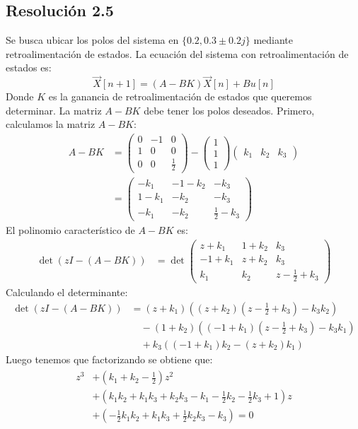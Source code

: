 \documentclass[
  11pt,
  letterpaper,
   addpoints,
   answers
  ]{exam}
\begin{document}
\begin{questions}
\begin{solution}
\subsection*{Resolución 2.5}
Se busca ubicar los polos del sistema en $\{0.2, 0.3 \pm 0.2j\}$ mediante retroalimentación de estados. La ecuación del sistema con retroalimentación de estados es:
\begin{equation}
  \vec{X}[n+1] = (A - BK)\vec{X}[n] + Bu[n]
\end{equation}
Donde $K$ es la ganancia de retroalimentación de estados que queremos determinar. La matriz $A - BK$ debe tener los polos deseados. Primero, calculamos la matriz $A - BK$:
\begin{align}
  A - BK &= \begin{pmatrix} 0 & -1 & 0 \\ 1 & 0 & 0 \\ 0 & 0 & \frac{1}{2} \end{pmatrix} - \begin{pmatrix} 1 \\ 1 \\ 1 \end{pmatrix} \begin{pmatrix} k_1 & k_2 & k_3 \end{pmatrix} \\
  &= \begin{pmatrix} -k_1 & -1 - k_2 & -k_3 \\ 1 - k_1 & -k_2 & -k_3 \\ -k_1 & -k_2 & \frac{1}{2} - k_3 \end{pmatrix}
\end{align}
El polinomio característico de $A - BK$ es:
\begin{align}
  \det(zI - (A - BK)) &= \det\begin{pmatrix} z + k_1 & 1 + k_2 & k_3 \\ -1 + k_1 & z + k_2 & k_3 \\ k_1 & k_2 & z - \frac{1}{2} + k_3 \end{pmatrix}
\end{align}
Calculando el determinante:
\begin{align}
  \det(zI - (A - BK)) &= (z + k_1)\left((z + k_2)(z - \frac{1}{2} + k_3) - k_3 k_2\right) \\
  &\quad - (1 + k_2)\left((-1 + k_1)(z - \frac{1}{2} + k_3) - k_3 k_1\right) \\
  &\quad + k_3\left((-1 + k_1)k_2 - (z + k_2)k_1\right)
\end{align}
Luego tenemos que factorizando se obtiene que:
{\normalsize
\begin{align}
 \begin{split}
 z^3 &+ (k_1 + k_2 - \frac{1}{2})z^2 \\
 &+ (k_1 k_2 + k_1 k_3 + k_2 k_3 - k_1 - \frac{1}{2}k_2 - \frac{1}{2}k_3 + 1)z \\
 &+ (-\frac{1}{2}k_1 k_2 + k_1 k_3 + \frac{1}{2}k_2 k_3 - k_3) = 0
 \end{split}
\end{align}}


\end{solution}
\end{questions}
\end{document}
